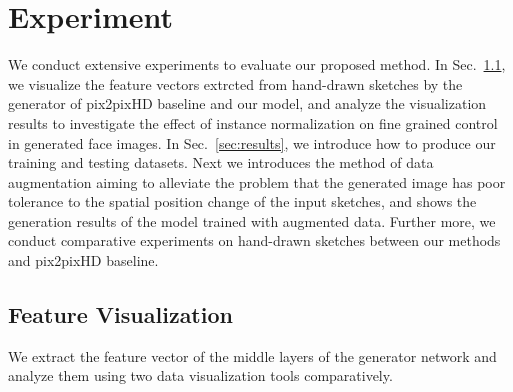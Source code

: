 \documentclass[10pt,twocolumn,letterpaper]{article}
\begin{document}
\section{Experiment}
We conduct extensive experiments to evaluate our proposed method.
In Sec.~\ref{sec:visualize}, we visualize the feature vectors extrcted from hand-drawn sketches by the generator of pix2pixHD baseline and our model, and analyze the visualization results to investigate the effect of instance normalization on fine grained control in generated face images.
In Sec.~\ref{sec:results}, we introduce how to produce our training and testing datasets. Next we introduces the method of data augmentation aiming to alleviate the problem that the generated image has poor tolerance to the spatial position change of the input sketches, and shows the generation results of the model trained with augmented data. Further more, we conduct comparative experiments on hand-drawn sketches between our methods and pix2pixHD baseline.

\subsection{Feature Visualization}\label{sec:visualize}
We extract the feature vector of the middle layers of the generator network and analyze them using two data visualization tools comparatively.
\end{document}
